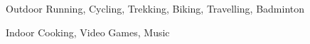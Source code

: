 \begin{cvskills}
\cvskill
    {Outdoor} %
    {Running, Cycling, Trekking, Biking, Travelling, Badminton} %

\cvskill
    {Indoor} %
    {Cooking, Video Games, Music} %

\end{cvskills}